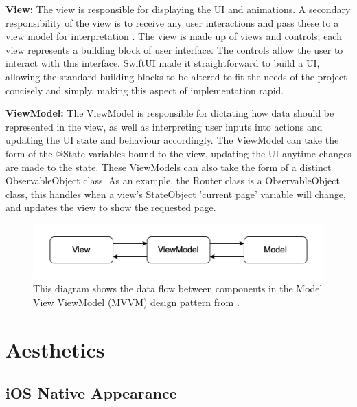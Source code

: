 \documentclass{l4proj}
\begin{document}
\textbf{View:} The view is responsible for displaying the UI and animations. A secondary responsibility of the view is to receive any user interactions and pass these to a view model for interpretation \citep{bulavin_modern_2020}. The view is made up of views and controls; each view represents a building block of user interface. The controls allow the user to interact with this interface. SwiftUI made it straightforward to build a UI, allowing the standard building blocks to be altered to fit the needs of the project concisely and simply, making this aspect of implementation rapid.

\textbf{ViewModel:} The ViewModel is responsible for dictating how data should be represented in the view, as well as interpreting user inputs into actions and updating the UI state and behaviour accordingly. The ViewModel can take the form of the @State variables bound to the view, updating the UI anytime changes are made to the state. These ViewModels can also take the form of a distinct ObservableObject class. As an example, the Router class is a ObservableObject class, this handles when a view's StateObject 'current page' variable will change, and updates the view to show the requested page.


\begin{figure}
    \centering
    \includegraphics[scale=0.5]{images/MVVMDataFlow.png}    
    \caption{This diagram shows the data flow between components in the Model View ViewModel (MVVM) design pattern from \citet{bulavin_modern_2020}.}
    \label{fig:MVVMDataFlow} 
\end{figure}


\section{Aesthetics}

\subsection{iOS Native Appearance}
\end{document}
